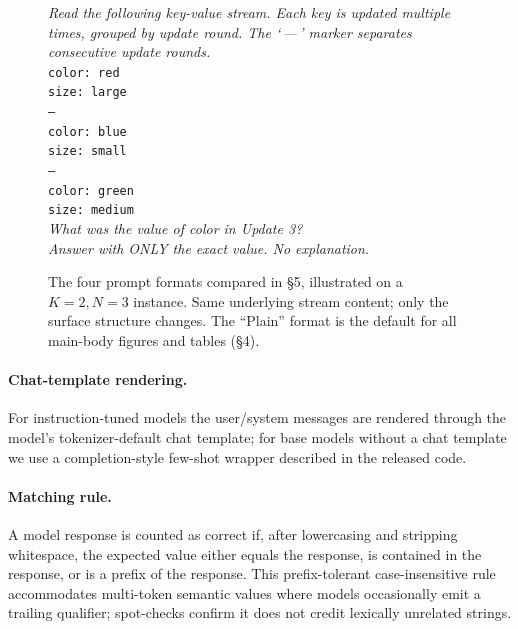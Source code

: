 \documentclass[letterpaper]{article} %
\begin{document}
\begin{figure}[h]
\begin{minipage}[t]{0.48\textwidth}
\begin{tcolorbox}[
    colframe=black!30, colback=gray!4,
    boxrule=0.5pt, arc=2pt,
    left=6pt, right=6pt, top=4pt, bottom=4pt,
    equal height group=fmts,
    title={\textbf{Landmark} (\texttt{landmark})},
    fonttitle=\small\bfseries,
    coltitle=black]
\emph{Read the following key-value stream. Each key is updated
multiple times, grouped by update round. The `\,---\,' marker
separates consecutive update rounds.}\\[4pt]
\texttt{color: red}\\
\texttt{size: large}\\
\texttt{---}\\
\texttt{color: blue}\\
\texttt{size: small}\\
\texttt{---}\\
\texttt{color: green}\\
\texttt{size: medium}\\[4pt]
\emph{What was the value of color in Update 3?}\\
\emph{Answer with ONLY the exact value. No explanation.}
\end{tcolorbox}
\end{minipage}
\caption{The four prompt formats compared in
\S5, illustrated on a $K{=}2, N{=}3$ instance.
Same underlying stream content; only the surface structure changes.
The ``Plain'' format is the default for all main-body figures and
tables (\S4).}
\label{fig:prompt_formats}
\end{figure}

\paragraph{Chat-template rendering.}
For instruction-tuned models the user/system messages are rendered
through the model's tokenizer-default chat template; for base
models without a chat template we use a completion-style few-shot
wrapper described in the released code.

\paragraph{Matching rule.}
A model response is counted as correct if, after lowercasing and
stripping whitespace, the expected value either equals the response,
is contained in the response, or is a prefix of the response. This
prefix-tolerant case-insensitive rule accommodates multi-token
semantic values where models occasionally emit a trailing
qualifier; spot-checks confirm it does not credit lexically
unrelated strings.
\end{document}
